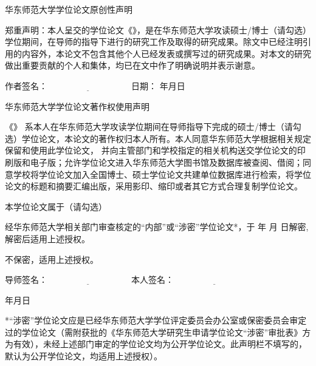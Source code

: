 \newpage
\thispagestyle{empty}

\vspace*{1em}

{
\linespread{1.4}
\centerline{\STSong 华东师范大学学位论文原创性声明}

\bigskip

郑重声明：本人呈交的学位论文《\cctitle》，是在华东师范大学攻读硕士/博士（请勾选）学位期间，在导师的指导下进行的研究工作及取得的研究成果。除文中已经注明引用的内容外，本论文不包含其他个人已经发表或撰写过的研究成果。对本文的研究做出重要贡献的个人和集体，均已在文中作了明确说明并表示谢意。

\vspace{1em}


{\STSong 作者签名}：$\underline{\hspace{4cm}}$ \hfill
{\STSong 日\quad 期}： \makebox[1.5cm][c]{}年\makebox[1cm][c]{}月\makebox[1cm][c]{}日

\vspace{4em}

\centerline{\STSong 华东师范大学学位论文著作权使用声明}
\bigskip


《\cctitle》
系本人在华东师范大学攻读学位期间在导师指导下完成的硕士/博士（请勾选）学位论文，本论文的著作权归本人所有。本人同意华东师范大学根据相关规定保留和使用此学位论文，
并向主管部门和学校指定的相关机构送交学位论文的印刷版和电子版；允许学位论文进入华东师范大学图书馆及数据库被查阅、借阅；同意学校将学位论文加入全国博士、硕士学位论文共建单位数据库进行检索，将学位论文的标题和摘要汇编出版，采用影印、缩印或者其它方式合理复制学位论文。

本学位论文属于（请勾选）
\begin{compactenum}
\item 经华东师范大学相关部门审查核定的“内部”或“涉密”学位论文*，于 \makebox[1cm][c]{} 年 \makebox[1cm][c]{} 月 \makebox[1cm][c]{} 日解密, 解密后适用上述授权。
\item 不保密，适用上述授权。
\end{compactenum}

\bigskip

{\STSong 导师签名}：$\underline{\hspace{4cm}}$ \hfill
{\STSong 本人签名}：$\underline{\hspace{4cm}}$

\bigskip

{\hfill\makebox[1.5cm][c]{}年\makebox[1cm][c]{}月\makebox[1cm][c]{}日}

\vfill

\parbox[t]{0.946\textwidth}{
*“涉密”学位论文应是已经华东师范大学学位评定委员会办公室或保密委员会审定过的学位论文（需附获批的《华东师范大学研究生申请学位论文“涉密”审批表》方为有效），未经上述部门审定的学位论文均为公开学位论文。此声明栏不填写的，默认为公开学位论文，均适用上述授权）。
}
}
